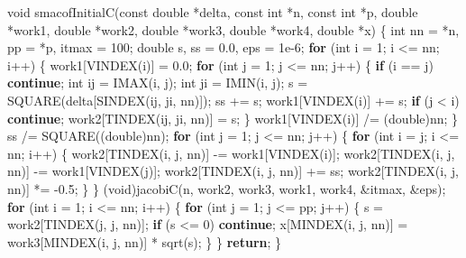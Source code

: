 \documentclass[12pt,]{article}
\newenvironment{Shaded}{\begin{snugshade}}{\end{snugshade}}
\newcommand{\DataTypeTok}[1]{\textcolor[rgb]{0.13,0.29,0.53}{#1}}
\newcommand{\DecValTok}[1]{\textcolor[rgb]{0.00,0.00,0.81}{#1}}
\newcommand{\FloatTok}[1]{\textcolor[rgb]{0.00,0.00,0.81}{#1}}
\newcommand{\ControlFlowTok}[1]{\textcolor[rgb]{0.13,0.29,0.53}{\textbf{#1}}}
\newcommand{\NormalTok}[1]{#1}
\begin{document}
\begin{Shaded}
\begin{Highlighting}[]
\DataTypeTok{void}\NormalTok{ smacofInitialC(}\DataTypeTok{const} \DataTypeTok{double}\NormalTok{ *delta, }\DataTypeTok{const} \DataTypeTok{int}\NormalTok{ *n, }\DataTypeTok{const} \DataTypeTok{int}\NormalTok{ *p,}
                    \DataTypeTok{double}\NormalTok{ *work1, }\DataTypeTok{double}\NormalTok{ *work2, }\DataTypeTok{double}\NormalTok{ *work3, }\DataTypeTok{double}\NormalTok{ *work4,}
                    \DataTypeTok{double}\NormalTok{ *x) \{}
    \DataTypeTok{int}\NormalTok{ nn = *n, pp = *p, itmax = }\DecValTok{100}\NormalTok{;}
    \DataTypeTok{double}\NormalTok{ s, ss = }\FloatTok{0.0}\NormalTok{, eps = }\FloatTok{1e-6}\NormalTok{;}
    \ControlFlowTok{for}\NormalTok{ (}\DataTypeTok{int}\NormalTok{ i = }\DecValTok{1}\NormalTok{; i <= nn; i++) \{}
\NormalTok{        work1[VINDEX(i)] = }\FloatTok{0.0}\NormalTok{;}
        \ControlFlowTok{for}\NormalTok{ (}\DataTypeTok{int}\NormalTok{ j = }\DecValTok{1}\NormalTok{; j <= nn; j++) \{}
            \ControlFlowTok{if}\NormalTok{ (i == j) }\ControlFlowTok{continue}\NormalTok{;}
            \DataTypeTok{int}\NormalTok{ ij = IMAX(i, j);}
            \DataTypeTok{int}\NormalTok{ ji = IMIN(i, j);}
\NormalTok{            s = SQUARE(delta[SINDEX(ij, ji, nn)]);}
\NormalTok{            ss += s;}
\NormalTok{            work1[VINDEX(i)] += s;}
            \ControlFlowTok{if}\NormalTok{ (j < i) }\ControlFlowTok{continue}\NormalTok{;}
\NormalTok{            work2[TINDEX(ij, ji, nn)] = s;}
\NormalTok{        \}}
\NormalTok{        work1[VINDEX(i)] /= (}\DataTypeTok{double}\NormalTok{)nn;}
\NormalTok{    \}}
\NormalTok{    ss /= SQUARE((}\DataTypeTok{double}\NormalTok{)nn);}
    \ControlFlowTok{for}\NormalTok{ (}\DataTypeTok{int}\NormalTok{ j = }\DecValTok{1}\NormalTok{; j <= nn; j++) \{}
        \ControlFlowTok{for}\NormalTok{ (}\DataTypeTok{int}\NormalTok{ i = j; i <= nn; i++) \{}
\NormalTok{            work2[TINDEX(i, j, nn)] -= work1[VINDEX(i)];}
\NormalTok{            work2[TINDEX(i, j, nn)] -= work1[VINDEX(j)];}
\NormalTok{            work2[TINDEX(i, j, nn)] += ss;}
\NormalTok{            work2[TINDEX(i, j, nn)] *= -}\FloatTok{0.5}\NormalTok{;}
\NormalTok{        \}}
\NormalTok{    \}}
\NormalTok{    (}\DataTypeTok{void}\NormalTok{)jacobiC(n, work2, work3, work1, work4, &itmax, &eps);}
    \ControlFlowTok{for}\NormalTok{ (}\DataTypeTok{int}\NormalTok{ i = }\DecValTok{1}\NormalTok{; i <= nn; i++) \{}
        \ControlFlowTok{for}\NormalTok{ (}\DataTypeTok{int}\NormalTok{ j = }\DecValTok{1}\NormalTok{; j <= pp; j++) \{}
\NormalTok{            s = work2[TINDEX(j, j, nn)];}
            \ControlFlowTok{if}\NormalTok{ (s <= }\DecValTok{0}\NormalTok{) }\ControlFlowTok{continue}\NormalTok{;}
\NormalTok{            x[MINDEX(i, j, nn)] = work3[MINDEX(i, j, nn)] * sqrt(s);}
\NormalTok{        \}}
\NormalTok{    \}}
    \ControlFlowTok{return}\NormalTok{;}
\NormalTok{\}}


\end{Highlighting}
\end{Shaded}
\end{document}
